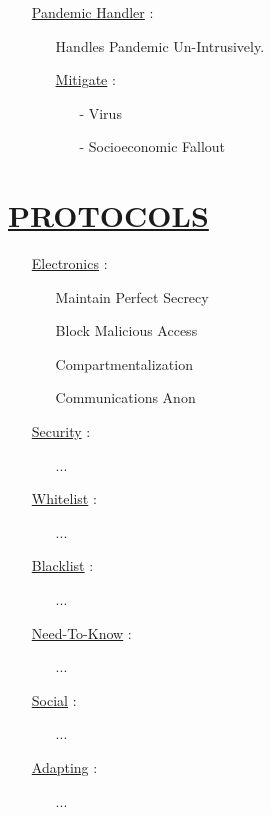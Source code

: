 \documentclass[11pt]{article}
\begin{document}
\begin{enumerate}
	\item[] \ul{Pandemic Handler} :
	\begin{enumerate}
		\item[] Handles Pandemic Un-Intrusively.
		
		\item[] \ul{Mitigate} :
		\begin{enumerate}
			\item[-] Virus
			\item[-] Socioeconomic Fallout
		\end{enumerate}
	\end{enumerate}

\end{enumerate}


\section*{\ul{PROTOCOLS}}
\begin{enumerate}
	\item[] \ul{Electronics} :
	\begin{enumerate}
		\item[] Maintain Perfect Secrecy
		\item[] Block Malicious Access
		\item[] Compartmentalization
		\item[] Communications Anon
	\end{enumerate}

	\item[] \ul{Security} :
	\begin{enumerate}
		\item[] ...
	\end{enumerate}

	\item[] \ul{Whitelist} :
	\begin{enumerate}
		\item[] ...
	\end{enumerate}
	
	\item[] \ul{Blacklist} :
	\begin{enumerate}
		\item[] ...
	\end{enumerate}

	\item[] \ul{Need-To-Know} :
	\begin{enumerate}
		\item[] ...
	\end{enumerate}

	\item[] \ul{Social}  :
	\begin{enumerate}
		\item[] ...
	\end{enumerate}

	\item[] \ul{Adapting} :
	\begin{enumerate}
		\item[] ...
	\end{enumerate}
\end{enumerate}
\end{document}
